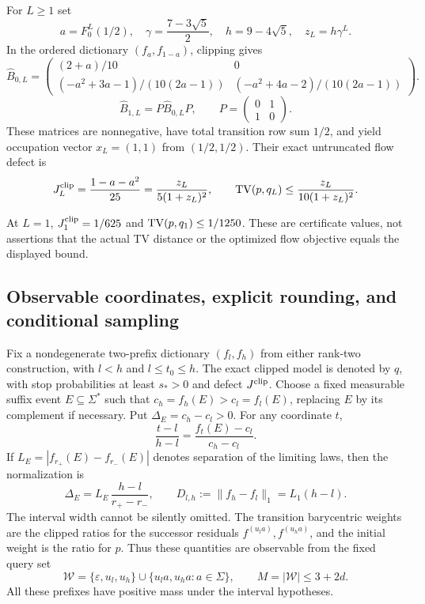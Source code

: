 \begin{proposition}
\label{II:U:prop:golden-clip}
For $L\ge1$ set
\[
 a=F_0^L(1/2),\quad
 \gamma=\frac{7-3\sqrt5}{2},\quad h=9-4\sqrt5,\quad z_L=h\gamma^L.
\]
In the ordered dictionary $(f_a,f_{1-a})$, clipping gives
\[
 \widehat B_{0,L}=
 \begin{pmatrix}
 (2+a)/10&0\\
 (-a^2+3a-1)/(10(2a-1))&(-a^2+4a-2)/(10(2a-1))
 \end{pmatrix}.
\]
\[
 \widehat B_{1,L}=P\widehat B_{0,L}P,\qquad
 P=\begin{pmatrix}0&1\\1&0\end{pmatrix}.
\]
These matrices are nonnegative, have total transition row sum $1/2$,
and yield occupation vector $x_L=(1,1)$ from $(1/2,1/2)$.
Their exact untruncated flow defect is
\begin{equation}
 J_L^{\rm clip}
 =\frac{1-a-a^2}{25}
 =\frac{z_L}{5(1+z_L)^2},\qquad
 \operatorname{TV}(p,q_L)\le\frac{z_L}{10(1+z_L)^2}.
 \label{II:U:eq:golden-exact-defect}
\end{equation}
\end{proposition}

At $L=1$, $J_1^{\rm clip}=1/625$ and $\operatorname{TV}(p,q_1)\le1/1250$.
These are certificate values, not assertions that the actual TV
distance or the optimized flow objective equals the displayed bound.


\subsection{Observable coordinates, explicit rounding, and conditional sampling}
\label{II:U:sec:rank-two-numerical}
Fix a nondegenerate two-prefix dictionary $(f_l,f_h)$ from either
rank-two construction, with $l<h$ and $l\le t_0\le h$.
The exact clipped model is denoted by $q$, with stop probabilities at
least $s_*>0$ and defect $J^{\rm clip}$. Choose a fixed measurable
suffix event $E\subseteq\Sigma^*$ such that
$c_h=f_h(E)>c_l=f_l(E)$, replacing $E$ by its complement if necessary.
Put $\Delta_E=c_h-c_l>0$. For any coordinate $t$,
\[
 \frac{t-l}{h-l}=\frac{f_t(E)-c_l}{c_h-c_l}.
\]
If $L_E=|f_{r_+}(E)-f_{r_-}(E)|$ denotes separation of the limiting
laws, then the normalization is
\begin{equation}
 \Delta_E=L_E\,\frac{h-l}{r_+-r_-},\qquad
 D_{l,h}:=\|f_h-f_l\|_1=L_1(h-l).
 \label{II:U:eq:observable-gap-correct}
\end{equation}
The interval width cannot be silently omitted. The transition
barycentric weights are the clipped ratios for the successor
residuals $f^{(u_l a)},f^{(u_h a)}$, and the initial weight is the
ratio for $p$. Thus these quantities are observable from the fixed
query set
\[
 \mathcal W=\{\varepsilon,u_l,u_h\}
       \cup\{u_l a,u_h a:a\in\Sigma\},\qquad M=|\mathcal W|\le3+2d.
\]
All these prefixes have positive mass under the interval hypotheses.

